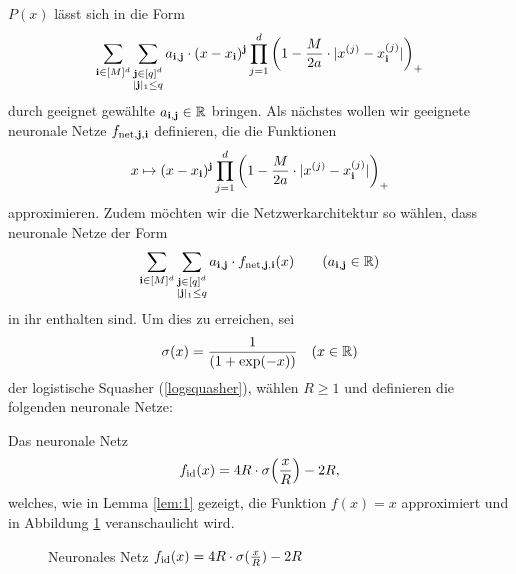$P(x)$ lässt sich in die Form 
$$\sum_{\mathbf{i} \in [M]^d} \sum_{\substack{ \mathbf{j} \in [q]^d\\|\mathbf{j}|_1 \leq q}} a_{\mathbf{i}, \mathbf{j}} \cdot (x - x_{\mathbf{i}})^{\mathbf{j}} \prod_{j = 1}^d \bigg(1 - \frac{M}{2a} \cdot |x^{(j)} - x_{\mathbf{i}}^{(j)}|\bigg)_+$$
durch geeignet gewählte $a_{\mathbf{i}, \mathbf{j}} \in \mathbb{R}$ bringen.
Als nächstes wollen wir geeignete neuronale Netze $f_{\mathrm{net}, \mathbf{j}, \mathbf{i}}$ definieren, die die Funktionen
$$x \mapsto (x - x_{\mathbf{i}})^{\mathbf{j}} \prod_{j = 1}^d \bigg(1 - \frac{M}{2a} \cdot |x^{(j)} - x_{\mathbf{i}}^{(j)}|\bigg)_+$$ approximieren. Zudem möchten wir die Netzwerkarchitektur so wählen, dass neuronale Netze der Form
$$\sum_{\mathbf{i} \in [M]^d} \sum_{\substack{ \mathbf{j} \in [q]^d\\|\mathbf{j}|_1 \leq q}} a_{\mathbf{i}, \mathbf{j}} \cdot f_{\mathrm{net},\mathbf{j},\mathbf{i}}(x) \qquad (a_{\mathbf{i},\mathbf{j}} \in \mathbb{R})$$ in ihr enthalten sind.
Um dies zu erreichen, sei $$\sigma(x) = \frac{1}{(1 + \exp(-x))} \quad (x \in \mathbb{R})$$ der logistische Squasher (\ref{logsquasher}), wählen $R \geq 1$ und definieren die folgenden neuronale Netze:

Das neuronale Netz
\begin{equation}
\label{def:fid}
f_{\mathrm{id}}(x) = 4R \cdot \sigma\Big(\frac{x}{R}\Big) - 2R,
\end{equation}
welches, wie in Lemma \ref{lem:1} gezeigt, die Funktion $f(x) = x$ approximiert und in Abbildung \ref{fig:fid} veranschaulicht wird.
\begin{figure}[htp]
\centering
{}

\caption{Neuronales Netz $f_{\mathrm{id}}(x) = 4R \cdot \sigma(\frac{x}{R}) - 2R$}
\label{fig:fid}
\end{figure}

